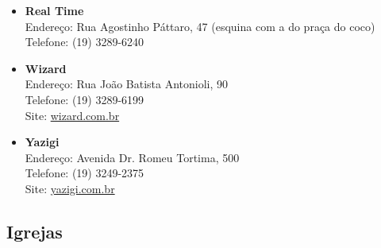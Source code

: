 \begin{itemize}
\item   \textbf{Real Time}
		\\Endereço: Rua Agostinho Páttaro, 47 (esquina com a do praça do coco)
		\\Telefone: (19) 3289-6240

\item   \textbf{Wizard}
		\\Endereço: Rua João Batista Antonioli, 90
		\\Telefone: (19) 3289-6199
		\\Site: \url{wizard.com.br}

\item   \textbf{Yazigi}
		\\Endereço: Avenida Dr. Romeu Tortima, 500
		\\Telefone: (19) 3249-2375
		\\Site: \url{yazigi.com.br}
\end{itemize}

\subsection{Igrejas}

